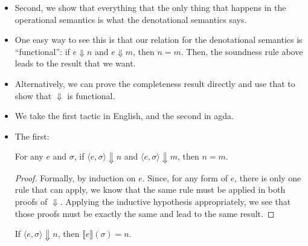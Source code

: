 \documentclass{lecturenotes}
\begin{document}
\begin{itemize}
\begin{proof}
    \noindent\textbf{Cases $e = e_1 \odot e_2$ where $\odot \in \{+, -, \ast\}$:}
    In these cases, $\llbracket e \rrbracket(\sigma) = \llbracket e_1 \rrbracket(\sigma) \odot \llbracket e_2 \rrbracket(\sigma)$.
    By IH, $\langle e_i , \sigma \rangle \Downarrow \llbracket e_i \rrbracket(\sigma)$.
    By applying the appropriate $\odot$ rule, we get the desired result.
  \end{proof}
\begin{code}
evalA-⇓ₐ : ∀ (c : AConfig) → c ⇓ₐ (evalA c)
evalA-⇓ₐ ⟨ const n , σ ⟩ = const-eval
evalA-⇓ₐ ⟨ var x , σ ⟩ = var-eval
evalA-⇓ₐ ⟨ e₁ ⊕ e₂ , σ ⟩ = plus-eval (evalA-⇓ₐ ⟨ e₁ , σ ⟩) (evalA-⇓ₐ ⟨ e₂ , σ ⟩)
evalA-⇓ₐ ⟨ e₁ - e₂ , σ ⟩ = minus-eval (evalA-⇓ₐ ⟨ e₁ , σ ⟩) (evalA-⇓ₐ ⟨ e₂ , σ ⟩)
evalA-⇓ₐ ⟨ e₁ ⊗ e₂ , σ ⟩ = times-eval (evalA-⇓ₐ ⟨ e₁ , σ ⟩) (evalA-⇓ₐ ⟨ e₂ , σ ⟩)    
\end{code}
\item Second, we show that everything that the only thing that happens in the operational semantics is what the denotational semantics says.
\item One easy way to see this is that our relation for the denotational semantics is ``functional'': if $e \Downarrow n$ and $e \Downarrow m$, then $n = m$.
  Then, the soundness rule above leads to the result that we want.
\item Alternatively, we can prove the completeness result directly and use that to show that $\Downarrow$ is functional.
\item We take the first tactic in English, and the second in agda.
\item The first:
  \begin{thm}
    For any $e$ and $\sigma$, if $\langle e, \sigma \rangle \Downarrow n$ and $\langle e, \sigma \rangle \Downarrow m$, then $n = m$.
  \end{thm}
  \begin{proof}
    Formally, by induction on $e$.
    Since, for any form of $e$, there is only one rule that can apply, we know that the same rule must be applied in both proofs of $\Downarrow$.
    Applying the inductive hypothesis appropriately, we see that those proofs must be exactly the same and lead to the same result.
  \end{proof}
  \begin{cor}
    If $\langle e , \sigma \rangle \Downarrow n$, then $\llbracket e \rrbracket(\sigma) = n$.
  \end{cor}

\end{itemize}
\end{document}
